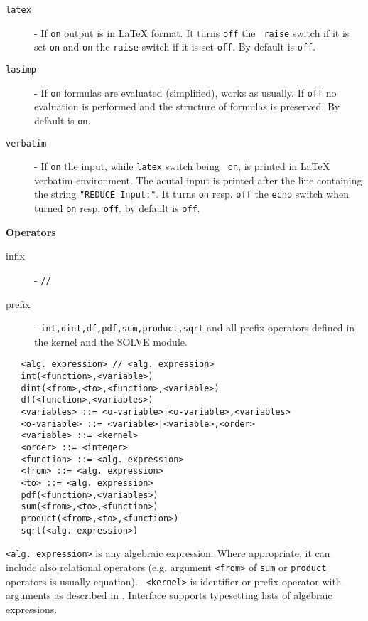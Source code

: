 \begin{description}
\item[{\tt latex}]
- If {\tt on} output is in \LaTeX{} format. It turns {\tt off} the {\tt
raise} switch if it is set {\tt on} and {\tt on} the {\tt raise} switch
if it is set {\tt off}. By default is {\tt off}.
\item[{\tt lasimp}]
- If {\tt on} formulas are evaluated (simplified), \REDUCE{} works
as usually. If {\tt off} no evaluation is performed and the structure
of formulas is preserved. By default is {\tt on}.
\item[{\tt verbatim}]
- If {\tt on} the \REDUCE{} input, while {\tt latex} switch being {\tt
on}, is printed in \LaTeX{} verbatim environment. The acutal \REDUCE{}
input is printed after the line containing the string {\tt "REDUCE
Input:"}.  It turns {\tt on} resp. {\tt off} the {\tt echo} switch when
turned {\tt on} resp. {\tt off}. by default is {\tt off}.
\end{description}

{\bf Operators}

\begin{description}
\item[infix] - \verb+//+
\item[prefix] - {\tt int,dint,df,pdf,sum,product,sqrt} and all \REDUCE{}
prefix operators defined in the \REDUCE{} kernel and the SOLVE module.
\end{description}

\begin{verbatim}
   <alg. expression> // <alg. expression>
   int(<function>,<variable>)
   dint(<from>,<to>,<function>,<variable>)
   df(<function>,<variables>)
   <variables> ::= <o-variable>|<o-variable>,<variables>
   <o-variable> ::= <variable>|<variable>,<order>
   <variable> ::= <kernel>
   <order> ::= <integer>
   <function> ::= <alg. expression>
   <from> ::= <alg. expression>
   <to> ::= <alg. expression>
   pdf(<function>,<variables>)
   sum(<from>,<to>,<function>)
   product(<from>,<to>,<function>)
   sqrt(<alg. expression>)
\end{verbatim}

{\tt <alg. expression>} is any algebraic expression. Where appropriate,
it can include also relational operators (e.g. argument {\tt <from>} of
{\tt sum} or {\tt product} operators is usually equation). {\tt
<kernel>} is identifier or prefix operator with arguments as described
in \cite{Hearn:95}. Interface supports typesetting lists of algebraic
expressions.


